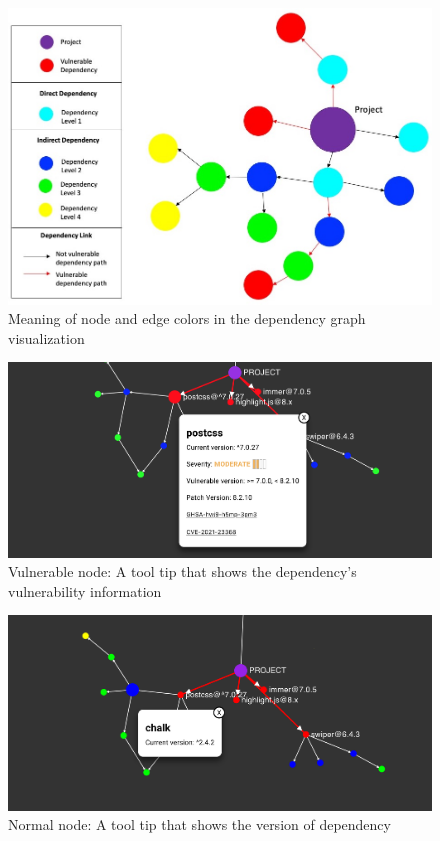 \documentclass[conference]{IEEEtran}
\begin{document}
	\begin{figure}[tb]
		\centering
		\includegraphics[width=\columnwidth]{Figures/Viz-concept-1.jpg}
		\caption{Meaning of node and edge colors in the dependency graph visualization}
		\label{fig:viz-concept}
	\end{figure}
	
	\begin{figure}
		\centering
		\includegraphics[width=\columnwidth]{Figures/tooltip_moderate}
		\caption{Vulnerable node: A tool tip that shows the dependency's vulnerability information}
		\label{fig:tooltip_moderate}
	\end{figure}
	
	\begin{figure}
		\centering
		\includegraphics[width=\linewidth]{Figures/tooltip_normal}
		\caption{Normal node: A tool tip that shows the version of dependency}
		\label{fig:tooltip_normal}
	\end{figure}
	
\end{document}
